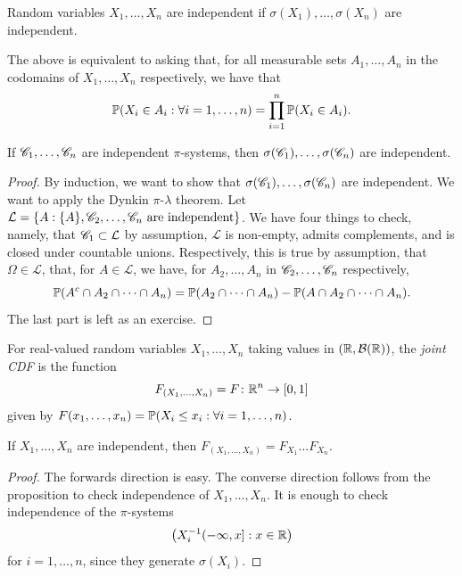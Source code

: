 \begin{definition} \label{defn:independence_for_rvs}
    Random variables $X_1, \dots, X_n$ are independent if $\sigma(X_1), \dots, \sigma(X_n)$ are independent.
\end{definition}
The above is equivalent to asking that, for all measurable sets $A_1, \dots, A_n$ in the codomains of $X_1, \dots, X_n$ respectively, we have that
\[ \mathbb P(X_i \in A_i : \forall i = 1, \dots, n) = \prod_{i=1}^n \mathbb P(X_i \in A_i). \]
\vspace{-16pt}
\begin{lemma}[Panchenko 1.6] \label{lem:independence_for_pi_systems}
    If $\mathscr C_1, \dots, \mathscr C_n$ are independent $\pi$-systems, then $\sigma(\mathscr C_1), \dots, \sigma(\mathscr C_n)$ are independent.
\end{lemma}
\begin{proof}
    By induction, we want to show that $\sigma(\mathscr C_1), \dots, \sigma(\mathscr C_n)$ are independent. We want to apply the Dynkin $\pi$-$\lambda$ theorem. Let $\mathcal L = \{ A : \{A\}, \mathscr C_2, \dots, \mathscr C_n \text{ are independent}\}$. We have four things to check, namely, that $\mathscr C_1 \subset \mathcal L$ by assumption, $\mathcal L$ is non-empty, admits complements, and is closed under countable unions. Respectively, this is true by assumption, that $\Omega \in \mathcal L$, that, for $A \in \mathcal L$, we have, for $A_2, \dots, A_n$ in $\mathscr C_2, \dots, \mathscr C_n$ respectively,
    \[ \mathbb P(A^c \cap A_2 \cap \dots \cap A_n) = \mathbb P(A_2 \cap \dots \cap A_n) - \mathbb P(A \cap A_2 \cap \dots \cap A_n). \]
    The last part is left as an exercise.
\end{proof}

\newpage
\begin{definition} \label{defn:joint_cdf}
    For real-valued random variables $X_1, \dots, X_n$ taking values in $(\mathbb R, \mathcal B(\mathbb R))$, the \textit{joint CDF} is the function
    \[ F_{(X_1, \dots, X_n)} = F \colon \mathbb R^n \to [0, 1] \]
    given by $F(x_1, \dots, x_n) = \mathbb P(X_i \leq x_i : \forall i = 1, \dots, n)$.
\end{definition}
If $X_1, \dots, X_n$ are independent, then $F_{(X_1, \dots, X_n)} = F_{X_1} \dots F_{X_n}$.
\begin{proof}
    The forwards direction is easy. The converse direction follows from the proposition to check independence of $X_1, \dots, X_n$. It is enough to check independence of the $\pi$-systems
    \[ \left(X_i^{-1} (-\infty, x] : x \in \mathbb R\right) \]
    for $i = 1, \dots, n$, since they generate $\sigma(X_i)$.
\end{proof}

